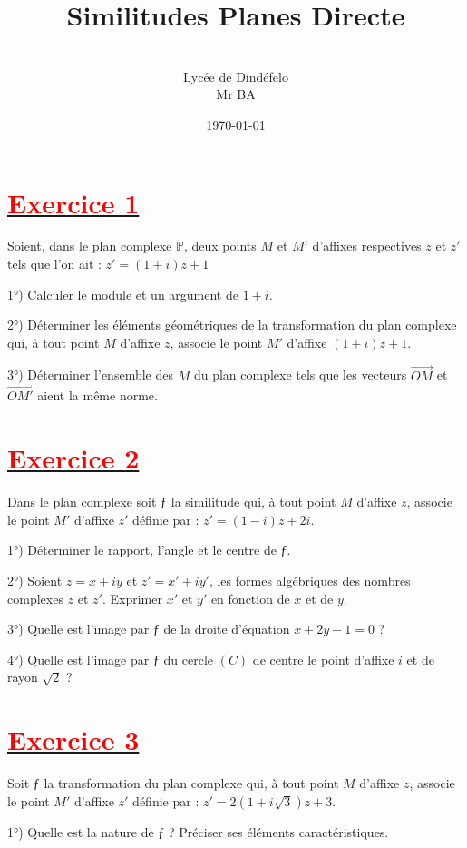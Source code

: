 \documentclass[12pt]{article}
\author{\\Lycée de Dindéfelo\\Mr BA}
\title{\textbf{Similitudes Planes Directe}}
\date{\today}
\begin{document}
\maketitle
\newpage
\section*{\underline{\textbf{\textcolor{red}{Exercice 1}}}}

Soient, dans le plan complexe $\mathbb{P}$, deux points $M$ et $M'$ d’affixes respectives $z$ et $z'$ tels que l’on ait : $z' = (1 + i) z + 1$

1°) Calculer le module et un argument de $1 + i$.

2°) Déterminer les éléments géométriques de la transformation du plan complexe qui, à tout point $M$ d’affixe $z$, associe le point $M'$ d’affixe $(1 + i) z +1$.

3°) Déterminer l’ensemble des $M$ du plan complexe tels que les vecteurs $\vec{OM}$ et $\vec{OM'}$ aient la même norme.

\section*{\underline{\textbf{\textcolor{red}{Exercice 2}}}}

Dans le plan complexe soit $ƒ$ la similitude qui, à tout point $M$ d’affixe $z$, associe le point $M'$ d’affixe $z'$ définie par : $z' = (1 - i) z + 2i$.

1°) Déterminer le rapport, l’angle et le centre de $ƒ$.

2°) Soient $z = x + iy$ et $z' = x' + iy'$, les formes algébriques des nombres complexes $z$ et $z'$. Exprimer $x'$ et $y'$ en fonction de $x$ et de $y$. 

3°) Quelle est l’image par $ƒ$ de la droite d’équation $x + 2y -1 = 0$ ?

4°) Quelle est l’image par $ƒ$ du cercle $(C)$ de centre le point d’affixe $i$ et de rayon $\sqrt{2}$ ?

\section*{\underline{\textbf{\textcolor{red}{Exercice 3}}}}

Soit $ƒ$ la transformation du plan complexe qui, à tout point $M$ d’affixe $z$, associe le point $M'$ d’affixe $z'$ définie par : $z' = 2(1 + i\sqrt{3})z + 3$.

1°) Quelle est la nature de $ƒ$ ? Préciser ses éléments caractéristiques.
\end{document}
